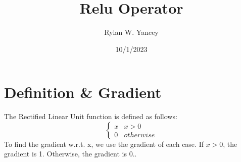 \documentclass{article}
\title{Relu Operator}
\author{Rylan W. Yancey}
\date{10/1/2023}
\begin{document}
  \maketitle
    \section*{Definition \& Gradient}
    The Rectified Linear Unit function is defined as follows:
    \[ \begin{cases} 
        x & x > 0 \\
        0 & otherwise
     \end{cases}
  \]
  To find the gradient w.r.t. x, we use the gradient of each case. If $x > 0$, the gradient is 1. Otherwise, the gradient is 0.. 
\end{document}
